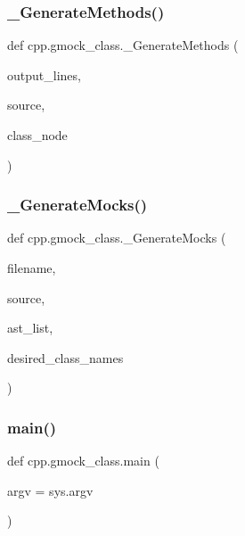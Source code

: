 \subsubsection{\texorpdfstring{\_GenerateMethods()}{\_GenerateMethods()}}
{\footnotesize\ttfamily def cpp.\+gmock\+\_\+class.\+\_\+\+Generate\+Methods (\begin{DoxyParamCaption}\item[{}]{output\+\_\+lines,  }\item[{}]{source,  }\item[{}]{class\+\_\+node }\end{DoxyParamCaption})\hspace{0.3cm}{\ttfamily [private]}}

\mbox{\label{namespacecpp_1_1gmock__class_a3f8d5ceabb0bd6143422efeccc900ca9}} 
\subsubsection{\texorpdfstring{\_GenerateMocks()}{\_GenerateMocks()}}
{\footnotesize\ttfamily def cpp.\+gmock\+\_\+class.\+\_\+\+Generate\+Mocks (\begin{DoxyParamCaption}\item[{}]{filename,  }\item[{}]{source,  }\item[{}]{ast\+\_\+list,  }\item[{}]{desired\+\_\+class\+\_\+names }\end{DoxyParamCaption})\hspace{0.3cm}{\ttfamily [private]}}

\mbox{\label{namespacecpp_1_1gmock__class_a8f99cfdd2b4f0a547d6585b1de78bac0}} 
\subsubsection{\texorpdfstring{main()}{main()}}
{\footnotesize\ttfamily def cpp.\+gmock\+\_\+class.\+main (\begin{DoxyParamCaption}\item[{}]{argv = {\ttfamily sys.argv} }\end{DoxyParamCaption})}



